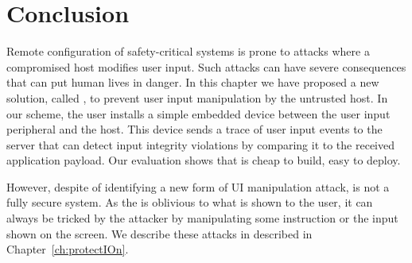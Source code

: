
\section{Conclusion}
\label{sec:conclusion_IK}

Remote configuration of safety-critical systems is prone to attacks where a compromised host modifies user input. Such attacks can have severe consequences that can put human lives in danger. In this chapter we have proposed a new solution, called \name, to prevent user input manipulation by the untrusted host. In our scheme, the user installs a simple embedded device between the user input peripheral and the host. This device sends a trace of user input events to the server that can detect input integrity violations by comparing it to the received application payload. Our evaluation shows that \name is cheap to build, easy to deploy.

However, despite of identifying a new form of UI manipulation attack, \integrikey is not a fully secure system. As the \device is oblivious to what is shown to the user, it can always be tricked by the attacker by manipulating some instruction or the input shown on the screen. We describe these attacks in \protection described in Chapter~\ref{ch:protectIOn}.
